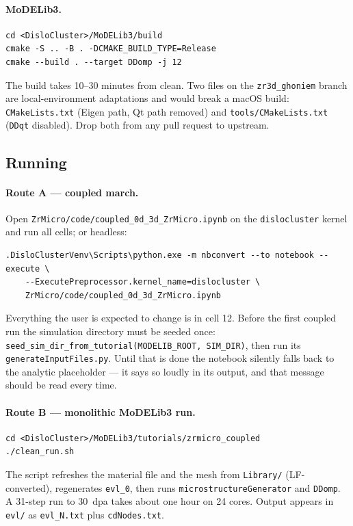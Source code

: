 \documentclass[11pt]{article}
\newcommand{\MoD}{\textsf{MoDELib3}}
\newcommand{\code}[1]{\texttt{\small #1}}
\newcommand{\file}[1]{\texttt{\footnotesize #1}}
\begin{document}
\paragraph*{\MoD{}.}
\begin{lstlisting}
cd <DisloCluster>/MoDELib3/build
cmake -S .. -B . -DCMAKE_BUILD_TYPE=Release
cmake --build . --target DDomp -j 12
\end{lstlisting}
The build takes 10--30 minutes from clean. Two files on the \file{zr3d\_ghoniem}
branch are local-environment adaptations and would break a macOS build:
\file{CMakeLists.txt} (Eigen path, Qt path removed) and
\file{tools/CMakeLists.txt} (\code{DDqt} disabled). Drop both from any pull
request to upstream.

\subsection{Running}

\paragraph*{Route A --- coupled march.}
Open \file{ZrMicro/code/coupled\_0d\_3d\_ZrMicro.ipynb} on the
\code{dislocluster} kernel and run all cells; or headless:
\begin{lstlisting}
.DisloClusterVenv\Scripts\python.exe -m nbconvert --to notebook --execute \
    --ExecutePreprocessor.kernel_name=dislocluster \
    ZrMicro/code/coupled_0d_3d_ZrMicro.ipynb
\end{lstlisting}
Everything the user is expected to change is in cell 12. Before the first
coupled run the simulation directory must be seeded once:
\code{seed\_sim\_dir\_from\_tutorial(MODELIB\_ROOT, SIM\_DIR)}, then run its
\file{generateInputFiles.py}. Until that is done the notebook silently falls
back to the analytic placeholder --- it says so loudly in its output, and that
message should be read every time.

\paragraph*{Route B --- monolithic \MoD{} run.}
\begin{lstlisting}
cd <DisloCluster>/MoDELib3/tutorials/zrmicro_coupled
./clean_run.sh
\end{lstlisting}
The script refreshes the material file and the mesh from \file{Library/}
(LF-converted), regenerates \file{evl\_0}, then runs
\code{microstructureGenerator} and \code{DDomp}. A 31-step run to 30~dpa takes
about one hour on 24 cores. Output appears in \file{evl/} as
\file{evl\_N.txt} plus \file{cdNodes.txt}.
\end{document}
